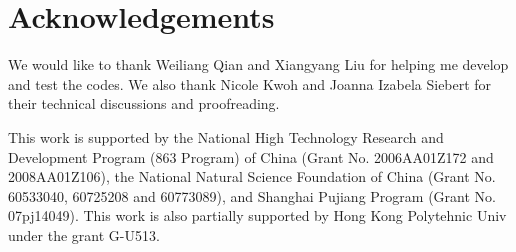 \section*{Acknowledgements}

We would like to thank Weiliang Qian and Xiangyang Liu for helping me develop and test the codes.
We also thank Nicole Kwoh and Joanna Izabela Siebert for their technical discussions and proofreading.

This work is supported by the National High Technology Research and
Development Program (863 Program) of China (Grant No. 2006AA01Z172 and
2008AA01Z106), the National Natural Science Foundation of China (Grant
No. 60533040, 60725208 and 60773089), and Shanghai Pujiang Program
(Grant No. 07pj14049). This work is also partially supported by Hong Kong Polytehnic Univ under the grant
G-U513. 
